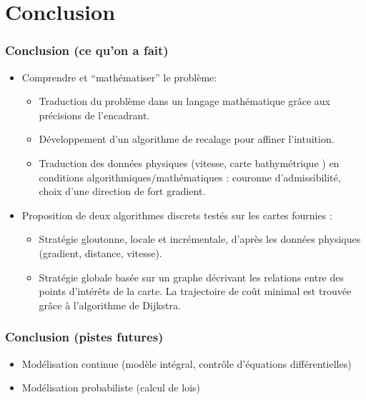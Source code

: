 \documentclass[11pt]{beamer}
\begin{document}
\section{Conclusion}
\begin{frame}
\frametitle{Conclusion (ce qu'on a fait)}
\begin{itemize}

\item Comprendre et ``mathématiser'' le problème:
\begin{itemize}
\item Traduction du problème dans un langage mathématique grâce aux
  précisions de l'encadrant.
\item Développement d'un algorithme de recalage pour affiner l'intuition.
\item Traduction des données physiques (vitesse, carte bathymétrique )
  en conditions algorithmiques/mathématiques : couronne d'admissibilité,
  choix d'une direction de fort gradient.
\end{itemize}

\item Proposition de deux algorithmes discrets testés sur les
  cartes fournies :
\begin{itemize}
\item Stratégie gloutonne, locale et incrémentale, d'après les données
  physiques (gradient, distance, vitesse).

\item Stratégie globale basée sur un graphe décrivant
  les relations entre des points d'intérêts de la carte. La
  trajectoire de coût minimal est trouvée grâce à l'algorithme de Dijkstra.
\end{itemize}
\end{itemize}
\end{frame}

\begin{frame}
\frametitle{Conclusion (pistes futures)}
\begin{itemize}
  \item Modélisation continue (modèle intégral, contrôle d'équations
    différentielles)
  \item Modélisation probabiliste (calcul de lois)
\end{itemize}
\end{frame}
\end{document}
